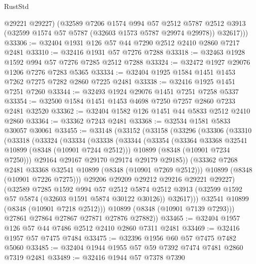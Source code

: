 \begin{lexlean}{RustStd}
\begin{coremodule}
          @29221
          @29227)
        (@32589
          @7206
          @1574
          @994
          @57
          @2512
          @5787
          @2512
          @3913
          (@32599 @1574 @57 @5787 (@32603 @1573 @5787 @29974 @29978))
          @32617)))
@33306 := @32404 @1931 @126 @57 @44 @7290 @2512 @2410 @2860 @7217 @2481
@33310 := @32416 @1931 @57 @7276 @7288
@33318 := @32463 @1928 @1592 @994 @57 @7276 @7285 @2512 @7288
@33324 := @32472 @1927 @29076 @1206 @7276 @7283 @5365
@33334 := @32404 @1925 @1584 @1451 @1453 @7262 @7275 @7282 @2860 @7225 @2481
@33338 := @32416 @1925 @1451 @7251 @7260
@33344 := @32493 @1924 @29076 @1451 @7251 @7258 @5337
@33354 := @32500 @1584 @1451 @1453 @4698 @7250 @7257 @2860 @7233 @2481 @32520
@33362 := @32404 @1582 @126 @1451 @44 @5833 @2512 @2410 @2860
@33364 := @33362 @7243 @2481
@33368 := @32534 @1581 @5833 @30057 @30061
@33455 := @33148
    (@33152
      (@33158
        (@33296
          (@33306
            (@33310
              (@33318
                (@33324
                  (@33334
                    (@33338
                      (@33344
                        (@33354
                          (@33364 @33368 @32541 @10899 (@8348 (@10901 @7244 @2512)))
                          @10899
                          (@8348 (@10901 @7234 @7250)))
                        @29164
                        @29167
                        @29170
                        @29174
                        @29179
                        @29185))
                    (@33362 @7268 @2481 @33368 @32541 @10899 (@8348 (@10901 @7269 @2512)))
                    @10899
                    (@8348 (@10901 @7226 @7275)))
                  @29206
                  @29209
                  @29212
                  @29216
                  @29221
                  @29227)
                (@32589
                  @7285
                  @1592
                  @994
                  @57
                  @2512
                  @5874
                  @2512
                  @3913
                  (@32599 @1592 @57 @5874 (@32603 @1591 @5874 @30122 @30126))
                  @32617)))
            @32541
            @10899
            (@8348 (@10901 @7218 @2512)))
          @10899
          (@8348 (@10901 @7139 @7293)))
        @27861
        @27864
        @27867
        @27871
        @27876
        @27882))
@33465 := @32404 @1957 @126 @57 @44 @7486 @2512 @2410 @2860 @7311 @2481
@33469 := @32416 @1957 @57 @7475 @7484
@33475 := @32396 @1956 @60 @57 @7475 @7482 @5060
@33485 := @32404 @1944 @1955 @57 @59 @7392 @7474 @7481 @2860 @7319 @2481
@33489 := @32416 @1944 @57 @7378 @7390

\end{coremodule}
\end{lexlean}
